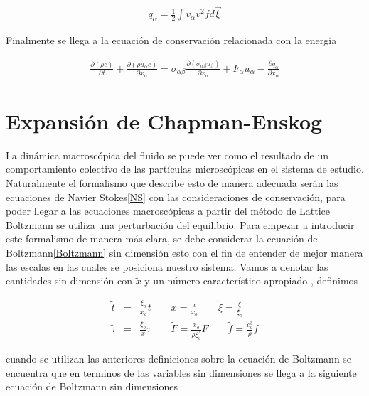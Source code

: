 \begin{eqnarray}
q_{\alpha} = \frac{1}{2}\int v_{\alpha} v^{2}f d\vec{\xi}
\end{eqnarray}

Finalmente se llega a la ecuación de conservación relacionada con la energía

\begin{eqnarray}
\boxed{
\frac{\partial (\rho e)}{\partial t} + \frac{\partial (\rho u_{\alpha}e)}{\partial x_{\alpha}}= \sigma_{\alpha\beta}\frac{\partial (\sigma_{\alpha\beta}u_{\beta})}{\partial x_{\alpha}}+ F_{\alpha}u_{\alpha}-\frac{\partial q_{\alpha}}{\partial x_{\alpha}}
}
\end{eqnarray}



\section{Expansión de Chapman-Enskog}

\noindent La dinámica macroscópica del fluido se puede ver como el resultado de un comportamiento colectivo de las partículas microscópicas en el sistema de estudio. Naturalmente el formalismo que describe esto de manera adecuada serán las ecuaciones de Navier Stokes\eqref{NS} con las consideraciones de conservación, para poder llegar a las ecuaciones macroscópicas a partir del método de Lattice Boltzmann se utiliza una perturbación del equilibrio. Para empezar a introducir este formalismo de manera más clara, se debe considerar la ecuación de Boltzmann\eqref{Boltzmann} sin dimensión  esto con el fin de entender de mejor manera las escalas en las cuales se posiciona nuestro sistema. Vamos a denotar las cantidades sin dimensión con $\widetilde{x}$ y un número característico apropiado , definimos

\begin{eqnarray}
\widetilde{t} &=& \frac{\xi_{o}}{x_{o}} t \qquad \widetilde{x} = \frac{x}{x_{o}}\qquad \widetilde{\xi}=\frac{\xi}{\xi_{o}}\nonumber\\
\widetilde{\tau} &=& \frac{\xi_{o}}{\overline{x}}\tau\qquad \widetilde{F} = \frac{x_{o}}{\rho\xi_{o}^{2}}F\qquad \widetilde{f} = \frac{c_{o}^{3}}{\rho}f
\end{eqnarray}

\noindent cuando se utilizan las anteriores definiciones sobre la ecuación de Boltzmann se encuentra que en terminos de las variables sin dimensiones se llega a la siguiente ecuación de Boltzmann sin dimensiones

